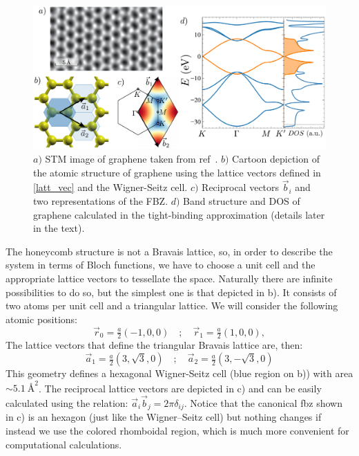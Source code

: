 \begin{figure}[h!]
\centering
\includegraphics{graphene/figures/graphene_summary.pdf}
\vspace{-5pt}
\caption{$a)$ STM image of graphene taken from ref~\cite{Huang2011}. $b)$ Cartoon depiction of the atomic structure of graphene using the lattice vectors defined in \eqref{latt_vec} and the Wigner-Seitz cell. $c)$ Reciprocal vectors $\vec{b}_i$ and two representations of the FBZ. $d)$ Band structure and DOS of graphene calculated in the tight-binding approximation (details later in the text).}
\label{graphene_summary}
\end{figure}
\FloatBarrier

The honeycomb structure is not a Bravais lattice, so, in order to describe the system in terms of Bloch functions, we have to choose a unit cell and the appropriate lattice vectors to tessellate the space.
Naturally there are infinite possibilities to do so, but the simplest one is that depicted in b).
It consists of two atoms per unit cell and a triangular lattice. We will consider the following atomic positions:
\begin{equation}
\vec{r}_0 = \tfrac{a}{2}(-1,0,0) \quad;\quad
\vec{r}_1 = \tfrac{a}{2}(1,0,0),
\label{at_pos}
\end{equation}
The lattice vectors that define the triangular Bravais lattice are, then:
\begin{equation}
\vec{a}_1 = \tfrac{a}{2}\left(3,\sqrt{3},0\right) \quad;\quad
\vec{a}_2 = \tfrac{a}{2}\left(3,-\sqrt{3},0\right)
\label{latt_vec}
\end{equation}
This geometry defines a hexagonal Wigner-Seitz cell (blue region on b)) with area $\sim\SI{5.1}{\angstrom\squared}$. The reciprocal lattice vectors are depicted in c) and can be easily calculated using the relation\cite{Ashcroft1976}: $\vec{a}_i\vec{b}_j=2\pi\delta_{ij}$. Notice that the canonical \ac{fbz} shown in c) is an hexagon (just like the Wigner–Seitz cell) but nothing changes if instead we use the colored rhomboidal region, which is much more convenient for computational calculations.
\medbreak


